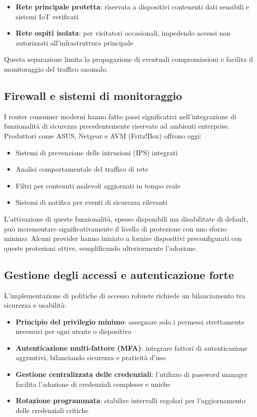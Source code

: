 \begin{itemize}
    \item \textbf{Rete principale protetta}: riservata a dispositivi contenenti dati sensibili e sistemi IoT verificati
    \item \textbf{Rete ospiti isolata}: per visitatori occasionali, impedendo accessi non autorizzati all'infrastruttura principale
\end{itemize}

Questa separazione limita la propagazione di eventuali compromissioni e facilita il monitoraggio del traffico anomalo.

\subsection{Firewall e sistemi di monitoraggio}

I router consumer moderni hanno fatto passi significativi nell'integrazione di funzionalità di sicurezza precedentemente riservate ad ambienti enterprise. Produttori come ASUS, Netgear e AVM (Fritz!Box) offrono oggi:
    \
\begin{itemize}
    \item Sistemi di prevenzione delle intrusioni (IPS) integrati
    \item Analisi comportamentale del traffico di rete
    \item Filtri per contenuti malevoli aggiornati in tempo reale
    \item Sistemi di notifica per eventi di sicurezza rilevanti
\end{itemize}

L'attivazione di queste funzionalità, spesso disponibili ma disabilitate di default, può incrementare significativamente il livello di protezione con uno sforzo minimo. Alcuni provider hanno iniziato a fornire dispositivi preconfigurati con queste protezioni attive, semplificando ulteriormente l'adozione.

\subsection{Gestione degli accessi e autenticazione forte}

L'implementazione di politiche di accesso robuste richiede un bilanciamento tra sicurezza e usabilità:

\begin{itemize}
    \item \textbf{Principio del privilegio minimo}: assegnare solo i permessi strettamente necessari per ogni utente o dispositivo
    \item \textbf{Autenticazione multi-fattore (MFA)}: integrare fattori di autenticazione aggiuntivi, bilanciando sicurezza e praticità d'uso
    \item \textbf{Gestione centralizzata delle credenziali}: l'utilizzo di password manager facilita l'adozione di credenziali complesse e uniche
    \item \textbf{Rotazione programmata}: stabilire intervalli regolari per l'aggiornamento delle credenziali critiche
\end{itemize}

